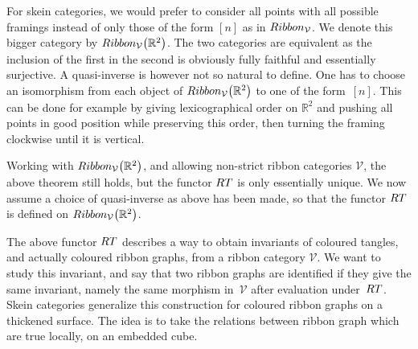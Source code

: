 \documentclass[11pt]{article}
\numberwithin{equation}{section}
\numberwithin{equation}{section}
\begin{document}
\begin{Remark}\label{rmkEqCatSkR2VV}
For skein categories, we would prefer to consider all points with all possible framings instead of only those of the form $[n]$ as in ${\rm Ribbon}_\mathcal{V}$. We denote this bigger category by ${\rm Ribbon}_\mathcal{V}\big(\mathbb{R}^2\big)$. The two categories are equivalent as the inclusion of the first in the second is obviously fully faithful and essentially surjective. A quasi-inverse is however not so natural to define. One has to choose an isomorphism from each object of ${\rm Ribbon}_\mathcal{V}\big(\mathbb{R}^2\big)$ to one of the form~$[n]$. This can be done for example by giving lexicographical order on $\mathbb{R}^2$ and pushing all points in good position while preserving this order, then turning the framing clockwise until it is vertical.

Working with ${\rm Ribbon}_\mathcal{V}\big(\mathbb{R}^2\big)$, and allowing non-strict ribbon categories $\mathcal{V}$, the above theorem still holds, but the functor ${\rm RT}$ is only essentially unique. We now assume a choice of quasi-inverse as above has been made, so that the functor ${\rm RT}$ is defined on ${\rm Ribbon}_\mathcal{V}\big(\mathbb{R}^2\big)$.
\end{Remark}

The above functor ${\rm RT}$ describes a way to obtain invariants of coloured tangles, and actually coloured ribbon graphs, from a ribbon category $\mathcal{V}$. We want to study this invariant, and say that two ribbon graphs are identified if they give the same invariant, namely the same morphism in~$\mathcal{V}$ after evaluation under~${\rm RT}$. Skein categories generalize this construction for coloured ribbon graphs on a thickened surface. The idea is to take the relations between ribbon graph which are true locally, on an embedded cube.
\end{document}

